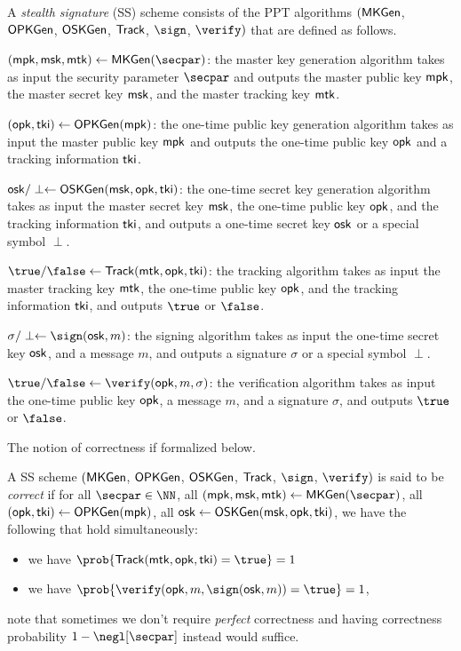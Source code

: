 \begin{definition}
\label{def:SS}
A \emph{stealth signature} (SS) scheme consists of the PPT algorithms $(\mathsf{MKGen}$, $\mathsf{OPKGen}$, $\mathsf{OSKGen}$, $\mathsf{Track}$, $\sign$, $\verify)$  that are defined as follows.

\smallskip\noindent\underline{$(\mpk, \msk, \mtk) \gets \mkgen(\secpar)$}: the master key generation algorithm takes as input the security parameter $\secpar$ and outputs the master public key $\mathsf{mpk}$, the master secret key $\mathsf{msk}$, and the master tracking key $\mathsf{mtk}$.

    \smallskip\noindent\underline{$(\mathsf{opk}, \mathsf{tki}) \gets \mathsf{OPKGen}(\mathsf{mpk})$}: the one-time public key generation algorithm takes as input the master public key $\mathsf{mpk}$ and outputs the one-time public key $\mathsf{opk}$ and a tracking information $\mathsf{tki}$.
    
    \smallskip\noindent\underline{$\mathsf{osk}/\perp \gets \mathsf{OSKGen}(\mathsf{msk}, \mathsf{opk}, \mathsf{tki})$}: the one-time secret key generation algorithm takes as input the master secret key $\mathsf{msk}$, the one-time public key $\mathsf{opk}$, and the tracking information $\mathsf{tki}$, and outputs a one-time secret key $\mathsf{osk}$ or a special symbol $\perp$.

    \smallskip\noindent\underline{$\true/\false \gets \track(\mtk, \opk, \tki)$}: the tracking algorithm takes as input the master tracking key $\mathsf{mtk}$, the one-time public key $\mathsf{opk}$, and the tracking information $\mathsf{tki}$, and outputs $\true$ or $\false$.
    
    \smallskip\noindent\underline{$\sigma/\perp \gets \sign(\osk, m)$}: the signing algorithm takes as input the one-time secret key $\mathsf{osk}$, and a message $m$, and outputs a signature $\sigma$ or a special symbol $\perp$.
    
    \smallskip\noindent\underline{$\true/\false \gets \verify(\opk, m, \sigma)$}: the verification algorithm takes as input the one-time public key $\mathsf{opk}$, a message $m$, and a signature $\sigma$, and outputs $\true$ or $\false$.

\end{definition}

The notion of correctness if formalized below. 

\begin{definition}[Correctness]
A SS scheme $(\mathsf{MKGen}$, $\mathsf{OPKGen}$, $\mathsf{OSKGen}$, $\mathsf{Track}$, $\sign$, $\verify)$  is said to be \emph{correct} if for all $\secpar \in \NN$,  all $(\mpk, \msk, \mtk) \gets \mkgen(\secpar)$, all $(\mathsf{opk}, \mathsf{tki}) \gets \mathsf{OPKGen}(\mathsf{mpk})$, all $\mathsf{osk} \gets \mathsf{OSKGen}(\mathsf{msk}, \mathsf{opk}, \mathsf{tki})$, we have the following that hold simultaneously:
\begin{itemize}[leftmargin=*]
    \item we have $\prob{\track(\mtk, \opk, \tki) = \true} = 1$ 
    \item we have $\prob{\verify(\opk, m, \sign(\osk, m))=\true} = 1$,
\end{itemize}
note that sometimes we don't require \emph{perfect} correctness and having correctness probability $1-\negl[\secpar]$ instead would suffice.
\end{definition}

